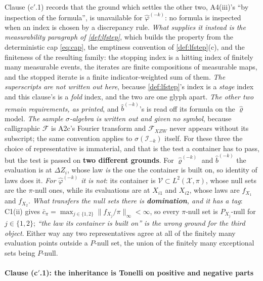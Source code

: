 Clause \textup{(c$'$.1)} records that the ground which settles the other two, A4(iii)'s ``by inspection
of the formula'', is unavailable for $\hat\varphi^{(-k)}$: no formula is inspected when an index is
chosen by a
discrepancy rule. \emph{What supplies it instead is the measurability paragraph of \cref{def:lfstep}}, which
builds the property from the deterministic cap \eqref{eq:cap}, the emptiness convention of
\cref{def:lfstep}\textup{(c)}, and the finiteness of the resulting family: the stopping index is a hitting
index of finitely many measurable events, the iterates are finite compositions of measurable maps, and the
stopped iterate is a finite indicator-weighted sum of them. \emph{The superscripts are not written out here},
because \cref{def:lfstep}'s index is a \emph{stage} index and this clause's is a \emph{fold} index, and the
two are one glyph apart. \emph{The other two remain requirements, as printed}, and $\hat b^{(-k)}$'s is read
off its formula on the $\hat\varrho$ model.
\emph{The sample $\sigma$-algebra is written out and given no symbol}, because
calligraphic $\mathcal F$ is A2c's Fourier transform and $\mathcal F_{XZW}$ never appears
without its subscript; the same convention applies to $\sigma(\mathcal I_{-k})$
itself.
For these three the choice of representative is immaterial, and that is the test a container has to
pass, but the test is passed on \textbf{two different grounds}. For $\hat\varrho^{(-k)}$ and $\hat b^{(-k)}$ the evaluation is at
$\Delta Z_i$, whose law \emph{is} the one the container is built on, so identity of laws does it. \emph{For
$\hat\varphi^{(-k)}$ it is not}: its container is $\mathcal V\subset L^{2}(\mathcal X,\pi)$, whose null
sets are the $\pi$-null ones, while its evaluations are at $X_{i1}$ and $X_{i2}$, whose laws are $f_{X_1}$
and $f_{X_2}$. \emph{What transfers the null sets there is \textbf{domination}, and it has a tag}: C1(ii)
gives $\bar c_\pi=\max_{j\in\{1,2\}}\|f_{X_j}/\pi\|_\infty<\infty$, so every $\pi$-null set is
$P_{X_j}$-null for $j\in\{1,2\}$; \emph{``the law its container is built on'' is the wrong ground for the
third object}. Either way any two representatives
agree at all of the finitely many evaluation points outside a $P$-null set, the union of the finitely many
exceptional sets being $P$-null.

\paragraph{Clause \textup{(c$'$.1)}: the inheritance is Tonelli on positive and negative parts}

